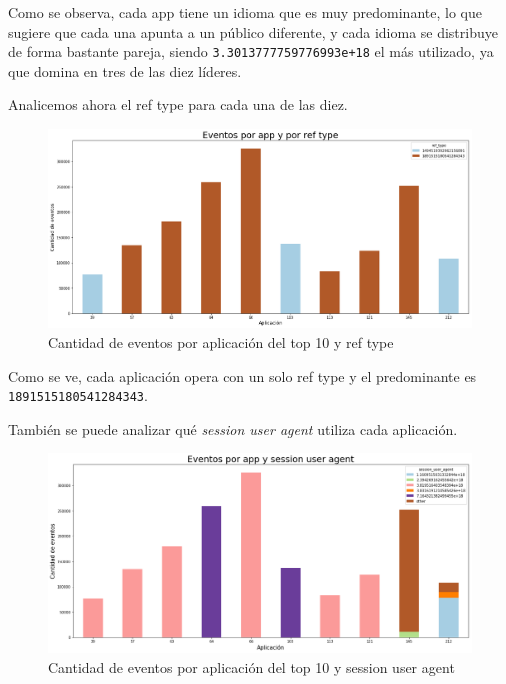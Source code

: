 \documentclass[a4paper, 12pt]{article}
\begin{document}
		Como se observa, cada app tiene un idioma que es muy predominante, lo que sugiere que cada una apunta a un público diferente, y cada idioma se distribuye de forma bastante pareja, siendo \texttt{3.3013777759776993e+18} el más utilizado, ya que domina en tres de las diez líderes.
		
		Analicemos ahora el ref type para cada una de las diez.
		
		\FloatBarrier
		\begin{figure}[h]
			\centering
			\includegraphics[width=\textwidth]{images/events/evxrf.png}
			\caption{Cantidad de eventos por aplicación del top 10 y ref type}
		\end{figure}
		\FloatBarrier
		
		Como se ve, cada aplicación opera con un solo ref type y el predominante es \texttt{1891515180541284343}.
		
		También se puede analizar qué \textit{session user agent} utiliza cada aplicación.
		
		\FloatBarrier
		\begin{figure}[h]
			\centering
			\includegraphics[width=\textwidth]{images/events/evxsua.png}
			\caption{Cantidad de eventos por aplicación del top 10 y session user agent}
		\end{figure}
		\FloatBarrier
		
\end{document}
